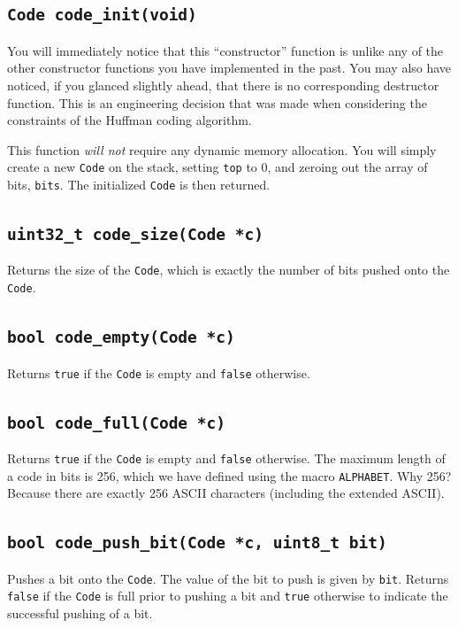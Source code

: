 \documentclass[11pt]{article}
\begin{document}
\subsection{\texttt{Code code\_init(void)}}

You will immediately notice that this ``constructor'' function is unlike
any of the other constructor functions you have implemented in the past.
You may also have noticed, if you glanced slightly ahead, that there is
no corresponding destructor function. This is an engineering decision
that was made when considering the constraints of the Huffman coding
algorithm.

This function \emph{will not} require any dynamic memory allocation. You
will simply create a new \texttt{Code} on the stack, setting
\texttt{top} to 0, and zeroing out the array of bits, \texttt{bits}.
The initialized \texttt{Code} is then returned.

\subsection{\texttt{uint32\_t code\_size(Code *c)}}

Returns the size of the \texttt{Code}, which is exactly the number of
bits pushed onto the \texttt{Code}.

\subsection{\texttt{bool code\_empty(Code *c)}}

Returns \texttt{true} if the \texttt{Code} is empty and \texttt{false}
otherwise.

\subsection{\texttt{bool code\_full(Code *c)}}

Returns \texttt{true} if the \texttt{Code} is empty and \texttt{false}
otherwise. The maximum length of a code in bits is 256, which we have
defined using the macro \texttt{ALPHABET}. Why 256? Because there are
exactly 256 ASCII characters (including the extended ASCII).

\subsection{\texttt{bool code\_push\_bit(Code *c, uint8\_t bit)}}

Pushes a bit onto the \texttt{Code}. The value of the bit to push is
given by \texttt{bit}. Returns \texttt{false} if the \texttt{Code} is
full prior to pushing a bit and \texttt{true} otherwise to indicate the
successful pushing of a bit.
\end{document}
